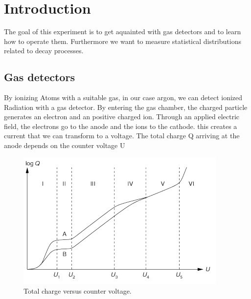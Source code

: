 {}
\thispagestyle{plain}

\tableofcontents
\newpage
\listoffigures

\listoftables

\skippage

\setcounter{page}{1}
\restoregeometry
\thispagestyle{fancy}


\section{Introduction}

The goal of this experiment is to get aquainted with gas detectors and to learn how to operate them. Furthermore we want to measure statistical distributions related to decay processes.

\subsection{Gas detectors}

By ionizing Atoms with a suitable gas, in our case argon, we can detect ionized Radiation with a gas detector.
By entering the gas chamber, the charged particle generates an electron and an positive charged ion.
Through an applied electric field, the electrons go to the anode and the ions to the cathode. this creates a current
that we can transform to a voltage.
The total charge Q arriving at the anode depends on the counter voltage U 

\begin{figure}[H]
\centering
\includegraphics[width=\textwidth]{../Figures/total.PNG}
\caption{Total charge versus counter voltage.}
\label{fig:Total}
\end{figure}

